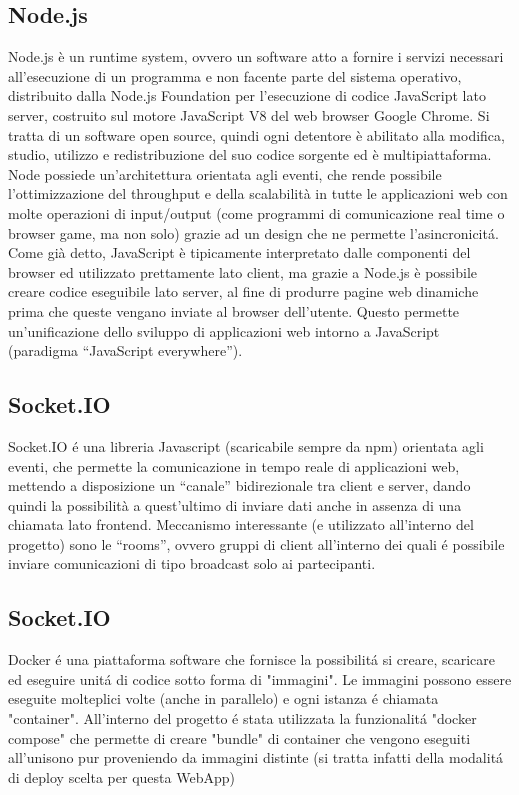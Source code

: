 \documentclass{report}
\begin{document}
\subsection{Node.js}
Node.js è un runtime system, ovvero un software atto a fornire i servizi necessari all’esecuzione di un programma e non facente parte del sistema operativo, distribuito dalla Node.js Foundation per l’esecuzione di codice JavaScript lato server, costruito sul motore JavaScript V8 del web browser Google Chrome. Si tratta di un software open source, quindi ogni detentore è abilitato alla modifica, studio, utilizzo e redistribuzione del suo codice sorgente ed è multipiattaforma.
\newline
Node possiede un’architettura orientata agli eventi, che rende possibile l’ottimizzazione del throughput e della scalabilità in tutte le applicazioni web con molte operazioni di input/output (come programmi di comunicazione real time o browser game, ma non solo) grazie ad un design che ne permette l’asincronicitá.
\newline
Come già detto, JavaScript è tipicamente interpretato dalle componenti del browser ed utilizzato prettamente lato client, ma grazie a Node.js è possibile creare codice eseguibile lato server, al fine di produrre pagine web dinamiche prima che queste vengano inviate al browser dell’utente. Questo permette un’unificazione dello sviluppo di applicazioni web intorno a JavaScript (paradigma “JavaScript everywhere”).

\subsection{Socket.IO}
Socket.IO é una libreria Javascript (scaricabile sempre da npm) orientata agli eventi, che permette la comunicazione in tempo reale di applicazioni web, mettendo a disposizione un “canale” bidirezionale tra client e server, dando quindi la possibilità a quest’ultimo di inviare dati anche in assenza di una chiamata lato frontend.
\newline \newline
Meccanismo interessante (e utilizzato all’interno del progetto) sono le “rooms”, ovvero gruppi di client all’interno dei quali é possibile inviare comunicazioni di tipo broadcast solo ai partecipanti.

\subsection{Socket.IO}
Docker é una piattaforma software che fornisce la possibilitá si creare, scaricare ed eseguire unitá di codice sotto forma di "immagini".
Le immagini possono essere eseguite molteplici volte (anche in parallelo) e ogni istanza é chiamata "container".
\newline \newline
All'interno del progetto é stata utilizzata la funzionalitá "docker compose" che permette di creare "bundle" di container che vengono eseguiti all'unisono pur proveniendo da immagini distinte (si tratta infatti della modalitá di deploy scelta per questa WebApp)
\end{document}
